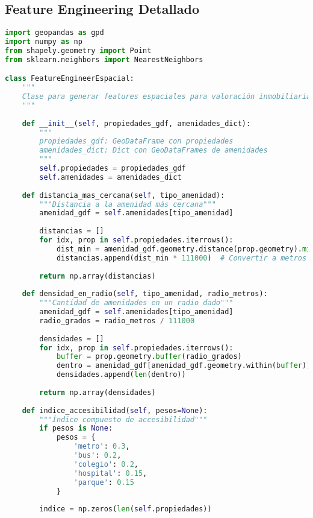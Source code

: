 \documentclass[11pt,a4paper]{article}
\begin{document}
\subsection{Feature Engineering Detallado}

\begin{lstlisting}[language=Python]
import geopandas as gpd
import numpy as np
from shapely.geometry import Point
from sklearn.neighbors import NearestNeighbors

class FeatureEngineerEspacial:
    """
    Clase para generar features espaciales para valoración inmobiliaria
    """
    
    def __init__(self, propiedades_gdf, amenidades_dict):
        """
        propiedades_gdf: GeoDataFrame con propiedades
        amenidades_dict: Dict con GeoDataFrames de amenidades
        """
        self.propiedades = propiedades_gdf
        self.amenidades = amenidades_dict
        
    def distancia_mas_cercana(self, tipo_amenidad):
        """Distancia a la amenidad más cercana"""
        amenidad_gdf = self.amenidades[tipo_amenidad]
        
        distancias = []
        for idx, prop in self.propiedades.iterrows():
            dist_min = amenidad_gdf.geometry.distance(prop.geometry).min()
            distancias.append(dist_min * 111000)  # Convertir a metros
            
        return np.array(distancias)
    
    def densidad_en_radio(self, tipo_amenidad, radio_metros):
        """Cantidad de amenidades en un radio dado"""
        amenidad_gdf = self.amenidades[tipo_amenidad]
        radio_grados = radio_metros / 111000
        
        densidades = []
        for idx, prop in self.propiedades.iterrows():
            buffer = prop.geometry.buffer(radio_grados)
            dentro = amenidad_gdf[amenidad_gdf.geometry.within(buffer)]
            densidades.append(len(dentro))
            
        return np.array(densidades)
    
    def indice_accesibilidad(self, pesos=None):
        """Índice compuesto de accesibilidad"""
        if pesos is None:
            pesos = {
                'metro': 0.3,
                'bus': 0.2,
                'colegio': 0.2,
                'hospital': 0.15,
                'parque': 0.15
            }
        
        indice = np.zeros(len(self.propiedades))
        

\end{lstlisting}
\end{document}
